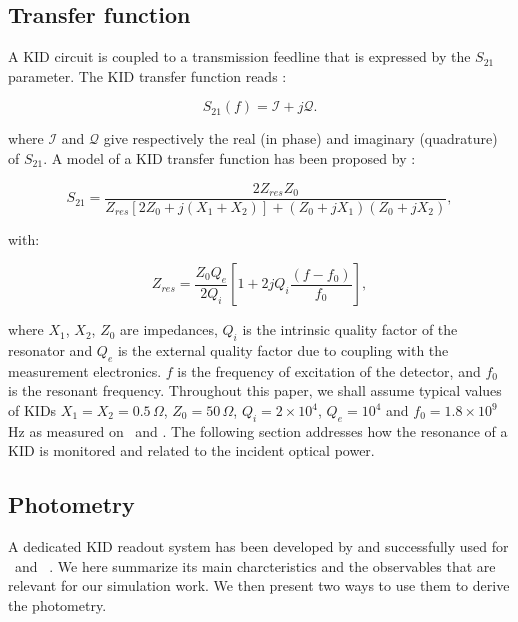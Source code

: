 \subsection{Transfer function}

A KID circuit is coupled to a transmission feedline that is expressed by the $S_{21}$ parameter. The KID transfer function reads : 

\begin{equation}
S_{21}(f) = \mathcal{I} +j\mathcal{Q} .
\end{equation}

\noindent where $\mathcal{I}$ and $\mathcal{Q}$ give respectively the real (in phase) and imaginary
(quadrature) of $S_{21}$. A model of a KID transfer function has been proposed
by \citet{2008ApPhL..93m4102G} :

\begin{equation}
S_{21} = \frac{2Z_{res}Z_{0}}{Z_{res}[2Z_{0} + j(X_{1}+X_{2})] + (Z_{0} +jX_{1})(Z_{0} +jX_{2})},
\end{equation}

with:

\begin{equation}
Z_{res} = \frac{Z_{0}Q_{e}}{2Q_{i}}[1 + 2jQ_{i}\frac{(f-f_{0})}{f_{0}}],
\end{equation}

\noindent where $X_{1}$, $X_{2}$, $Z_{0}$ are impedances, $Q_{i}$ is the
intrinsic quality factor of the resonator and $Q_{e}$ is the external quality
factor due to coupling with the measurement electronics. $f$ is the frequency of
excitation of the detector, and $f_{0}$ is the resonant frequency. Throughout
this paper, we shall assume typical values of KIDs $X_{1} = X_{2} =
0.5\,\Omega$, $Z_{0} = 50\,\Omega$, $Q_i=2\times 10^4$, $Q_e=10^4$ and $f_{0} =
1.8\times 10^9$\,Hz as measured on \nika\ and \nikad. The following section
addresses how the resonance of a KID is monitored and related to the incident
optical power.

\subsection{Photometry}
\label{sec:signal}

A dedicated KID readout system has been developed by \citet{2013A&A...551L..12C}
and successfully used for \nika\ and \ \citep{2010A&A...521A..29M,2016JLTP..184..816C}. We here summarize its main charcteristics and the observables
that are relevant for our simulation work. We then present two ways to use them
to derive the photometry.

